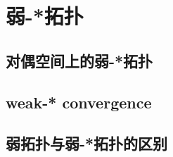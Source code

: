 \section{弱-*拓扑}
\label{b1:sec:0902}


\subsection{对偶空间上的弱-*拓扑}
\label{b1:subsec:090201}

\subsection{weak-* convergence}
\label{b1:subsec:090202}

\subsection{弱拓扑与弱-*拓扑的区别}
\label{b1:subsec:090203}


